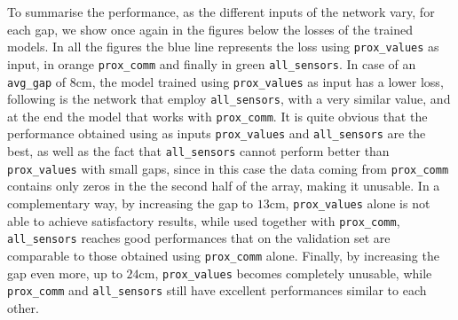 \medskip
To summarise the performance, as the different inputs of the network vary, for 
each gap, we show once again in the figures below the losses of the trained 
models. In all the figures the blue line represents the loss using 
\texttt{prox\_values} as input, in orange \texttt{prox\_comm} and finally in green 
\texttt{all\_sensors}.
In case of an \texttt{avg\_gap} of $8$\gls{cm}, the model trained using 
\texttt{prox\_values} as input has a lower loss, following is the network that 
employ \texttt{all\_sensors}, with a very similar value, and at the end the model 
that works with \texttt{prox\_comm}.
It is quite obvious that the performance obtained using as inputs 
\texttt{prox\_values} and \texttt{all\_sensors} are the best, as well as the fact that 
\texttt{all\_sensors} cannot perform better than \texttt{prox\_values} with small 
gaps, since in this case the data coming from \texttt{prox\_comm} contains only 
zeros in the the second half of the array, making it unusable.
In a complementary way, by increasing the gap to $13$\gls{cm},  
\texttt{prox\_values} alone is not able to achieve satisfactory results, while used 
together with \texttt{prox\_comm}, \texttt{all\_sensors} reaches good 
performances that on the validation set are comparable to those obtained using 
\texttt{prox\_comm} alone.
Finally, by increasing the gap even more, up to $24$\gls{cm}, 
\texttt{prox\_values} becomes completely unusable, while \texttt{prox\_comm} 
and \texttt{all\_sensors} still have excellent performances similar to each other.

